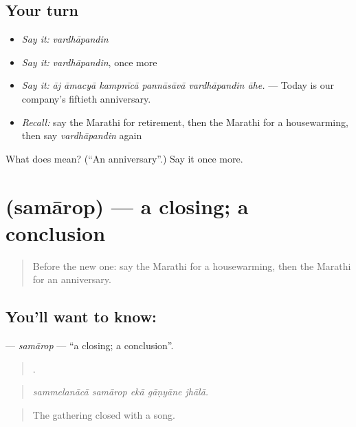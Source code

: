 \subsection*{Your turn}
\begin{itemize}
\raggedright
  \item \emph{Say it:} \emph{vardhāpandin}
  \item \emph{Say it:} \emph{vardhāpandin}, once more
  \item \emph{Say it:} \emph{āj āmacyā kampnīcā pannāsāvā vardhāpandin āhe.} — Today is our company's fiftieth anniversary.
  \item \emph{Recall:} say the Marathi for retirement, then the Marathi for a housewarming, then say \emph{vardhāpandin} again
\end{itemize}

\begin{tcolorbox}[breakable,colback=teal!4,colframe=teal!35!black,title={Before you move on}]
What does  mean? (\textquotedblleft{}An anniversary\textquotedblright{}.) Say it once more.
\end{tcolorbox}
\section[\texorpdfstring{\mr{समारोप} (samārop)}{समारोप (samārop)}]{ (samārop) — a closing; a conclusion}

\label{lesson:MR-C323-samarop}



\begin{quote}
Before the new one: say the Marathi for a housewarming, then the Marathi for an anniversary.
\end{quote}

\subsection*{You'll want to know: }
\textbf{} — \emph{samārop} — \textquotedblleft{}a closing; a conclusion\textquotedblright{}.

\begin{quote}
    .
\end{quote}

\begin{quote}
\emph{sammelanācā samārop ekā gāṇyāne jhālā.}
\end{quote}

\begin{quote}
The gathering closed with a song.
\end{quote}

